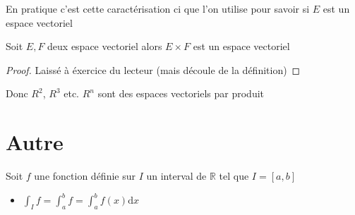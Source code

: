\documentclass[11pt,colorlinks]{book}
\theoremstyle{mytheoremstyle}
\theoremstyle{mytheoremstyle}
\theoremstyle{mytheoremstyle}
\theoremstyle{mytheoremstyle}
\theoremstyle{mytheoremstyle}
\theoremstyle{mytheoremstyle}
\theoremstyle{mytheoremstyle}
\theoremstyle{mytheoremstyle}
\theoremstyle{myproblemstyle}
\def\mbb#1{\mathbb{#1}}
\def\bR{\mbb{R}}
\def\ev{espace vectoriel }
\begin{document}
\begin{rmq}
  En pratique c'est cette caractérisation ci que l'on utilise pour savoir si $E$ est un espace vectoriel
\end{rmq}
\begin{prop}
  Soit $E,F$ deux \ev alors $E \times F$ est un \ev 
  \begin{proof}
    Laissé à éxercice du lecteur (mais découle de la définition)
  \end{proof}
\end{prop}
\begin{rmq}
  Donc $R^2$, $R^3$ etc. $R^n$ sont des espaces vectoriels par produit
\end{rmq}
\section{Autre}
\begin{rmq}
  Soit $f$ une fonction définie sur $I$ un interval de $\bR$ tel que $I = [a,b]$
  \begin{itemize}
    \item $\int_I f = \int_a^b f = \int_a^b f(x) \text{d}x$
  \end{itemize}
\end{rmq}
\end{document}
